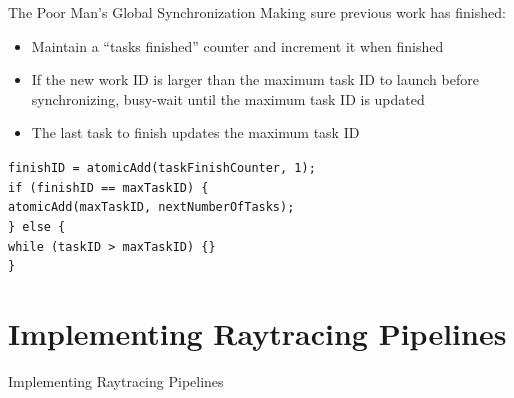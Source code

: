 \documentclass[aspectratio=169,t]{beamer}
\begin{document}
\begin{slide}{The Poor Man's Global Synchronization}
   Making sure previous work has finished:\\
  \begin{itemize}
   \item Maintain a ``tasks finished'' counter and increment it when finished
   \item If the new work ID is larger than the maximum task ID to launch before synchronizing, busy-wait until the maximum task ID is updated
   \item The last task to finish updates the maximum task ID
  \end{itemize}

  \texttt{finishID = atomicAdd(taskFinishCounter, 1);\\
  if (finishID == maxTaskID) \{\\
  \hspace*{8pt}atomicAdd(maxTaskID, nextNumberOfTasks);\\
  \}
  else \{\\
  \hspace*{8pt}while (taskID > maxTaskID) \{\}\\
  \}
  }\\
\end{slide}

\section{Implementing Raytracing Pipelines}

\chapterIntroConfig
\begin{slide}{Implementing Raytracing Pipelines}
\end{slide}
\end{document}

